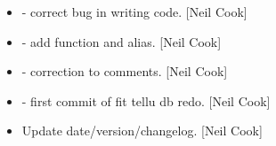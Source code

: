 \documentclass[a4paper,10pt,english]{report}
\begin{document}
\begin{itemize}
\item {} 
 - correct bug in writing code. {[}Neil Cook{]}

\item {} 
 - add  function and alias. {[}Neil Cook{]}

\item {} 
 - correction to comments. {[}Neil Cook{]}

\item {} 
 - first commit of fit tellu db redo. {[}Neil Cook{]}

\item {} 
Update date/version/changelog. {[}Neil Cook{]}

\end{itemize}
\end{document}
